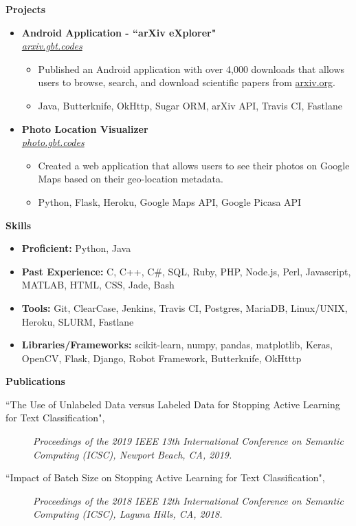 \documentclass[letterpaper,10pt]{article}
\newcommand{\resitem}[1]{\item #1 \vspace{-2pt}}
\newcommand{\resheading}[1]{{\large \colorbox{mygrey}{\begin{minipage}{\textwidth}{\textbf{#1 \vphantom{p\^{E}}}}\end{minipage}}}}
\newcommand{\ressubheading}[4]{%
  \item\textbf{#1} \hfill #2\null\\
  \textit{#3} \hfill \textit{#4}%
  \vspace{-5pt}
}%
\begin{document}
\resheading{Projects}
\begin{itemize}

\ressubheading{Android Application - ``arXiv eXplorer"}{}{\href{http://arxiv.gbt.codes}{arxiv.gbt.codes}}{}
	\begin{itemize}
		\resitem{Published an Android application with over 4,000 downloads that allows users to browse, search, and download scientific papers from \href{http://arxiv.org}{arxiv.org}.}
		\resitem{Java, Butterknife, OkHttp, Sugar ORM, arXiv API, Travis CI, Fastlane}
	\end{itemize}
	

\ressubheading{Photo Location Visualizer}{}{\href{http://photo.gbt.codes}{photo.gbt.codes}}{}
	\begin{itemize}
		\resitem{Created a web application that allows users to see their photos on Google Maps based on their geo-location metadata.}
		\resitem{Python, Flask, Heroku, Google Maps API, Google Picasa API}
	\end{itemize}



\end{itemize}

\resheading{Skills}
	\begin{itemize}
	\resitem{\textbf{Proficient:} Python, Java}
	\resitem{\textbf{Past Experience:} C, C++, C\#, SQL, Ruby, PHP, Node.js, Perl, Javascript, MATLAB, HTML, CSS, Jade, Bash}
	\resitem{\textbf{Tools:} Git, ClearCase, Jenkins, Travis CI, Postgres, MariaDB, Linux/UNIX, Heroku, SLURM, Fastlane}
	\resitem{\textbf{Libraries/Frameworks:} scikit-learn, numpy, pandas, matplotlib, Keras, OpenCV, Flask, Django, Robot Framework, Butterknife, OkHtttp}
	\end{itemize}

\resheading{Publications}
\begin{description}
\item[``The Use of Unlabeled Data versus Labeled Data for Stopping Active Learning for Text Classification",]
\emph{Proceedings of the 2019 IEEE 13th International Conference on Semantic Computing (ICSC), Newport Beach, CA, 2019.}
\item[``Impact of Batch Size on Stopping Active Learning for Text Classification",]
\emph{Proceedings of the 2018 IEEE 12th International Conference on Semantic Computing (ICSC), Laguna Hills, CA, 2018.}
\end{description}
\end{document}
